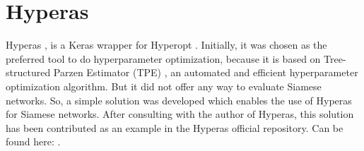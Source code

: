 
\chapter{Hyperas}
\label{chap:hyperas}
\label{hyperas}
Hyperas \cite{hyperas}, is a Keras wrapper for Hyperopt \cite{bergstra2015hyperopt}. Initially, it was chosen as the preferred tool 
to do hyperparameter optimization, because it is based on Tree-structured Parzen Estimator (TPE) \cite{bergstra2011algorithms}, an automated and efficient hyperparameter optimization algorithm.
But it did not offer any way to evaluate Siamese networks. 
So, a simple solution was developed which enables the use of Hyperas for Siamese networks. After consulting with the author of Hyperas, 
this solution has been contributed as an example in the Hyperas official repository. Can be found here:
.